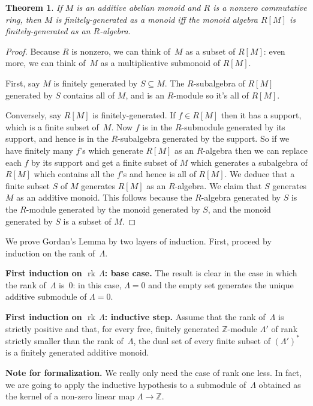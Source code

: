 \documentclass{amsart}
\newcommand{\Z}{\mathbb{Z}}
\newcommand{\form}[1]{\medskip
\parbox{330pt}
{\small{{\textbf{Note for formalization.}}
#1}}
\medskip}
\DeclareMathOperator{\rk}{rk\,}
\newtheorem{theorem}{Theorem}
\begin{document}
\begin{theorem} \label{t:RMfg}
If $M$ is an additive abelian monoid and $R$ is a nonzero commutative ring, then $M$ is finitely-generated as a monoid iff the monoid algebra $R[M]$ is finitely-generated as an $R$-algebra.
\end{theorem}
\begin{proof} Because $R$ is nonzero, we can think of~$M$ as a subset of $R[M]$: even more, we can think of~$M$ as a multiplicative submonoid of $R[M]$.

First, say $M$ is finitely generated by $S\subseteq M$. The $R$-subalgebra of $R[M]$ generated by $S$ contains all of $M$, and is an $R$-module so it's all of $R[M]$.

Conversely, say $R[M]$ is finitely-generated. If $f\in R[M]$ then it has a support, which is a finite subset of~$M$. Now $f$ is in the $R$-submodule generated by its support, and hence is in the $R$-subalgebra generated by the support. So if we have finitely many $f$'s which generate $R[M]$ as an $R$-algebra then we can replace each $f$ by its support and get a finite subset of $M$ which generates a subalgebra of $R[M]$ which contains all the $f$'s and hence is all of $R[M]$. We deduce that a finite subset $S$ of $M$ generates $R[M]$ as an $R$-algebra. We claim that $S$ generates $M$ as an additive monoid. This follows because the $R$-algebra generated by $S$ is the $R$-module generated by the monoid generated by $S$, and the monoid generated by $S$ is a subset of $M$.
\end{proof}

We prove Gordan's Lemma by two layers of induction.  First, proceed by induction on the rank of~$\Lambda$.

\noindent
{\textbf{First induction on $\rk \Lambda$: base case.}}
The result is clear in the case in which the rank of~$\Lambda$ is~$0$: in this case, $\Lambda = 0$ and the empty set generates the unique additive submodule of $\Lambda = 0$.

\noindent
{\textbf{First induction on $\rk \Lambda$: inductive step.}}
Assume that the rank of~$\Lambda$ is strictly positive and that, for every free, finitely generated $\Z$-module $\Lambda'$ of rank strictly smaller than the rank of~$\Lambda$, the dual set of every finite subset of $\left(\Lambda'\right)^*$ is a finitely generated additive monoid.

\form{We really only need the case of rank one less.  In fact, we are going to apply the inductive hypothesis to a submodule of~$\Lambda$ obtained as the kernel of a non-zero linear map $\Lambda \to \Z$.}
\end{document}
